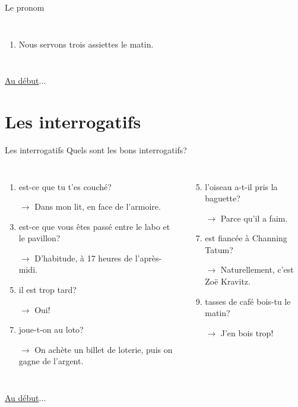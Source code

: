 \documentclass{beamer}
\begin{document}
\begin{frame}{Le pronom }
\begin{columns}[t]
\begin{enumerate}
            \item Nous \underline{  } servons \underline{\hspace{0.35cm}} trois \underline{\hspace{0.35cm}} assiettes \underline{\hspace{0.35cm}} le matin.
          \end{enumerate}
      \end{columns}
      \vspace{0.5cm}
      \hyperlink{début}{Au début}...
    \end{frame}

  \section{Les interrogatifs}
    \begin{frame}{Les interrogatifs}
      Quels sont les bons interrogatifs?
      \begin{columns}[t]
        \scriptsize
          \begin{enumerate}
            \item \underline{} est-ce que tu t'es couché?
            \item[$\to$] Dans mon lit, en face de l'armoire.
            \item \underline{} est-ce que vous êtes passé entre le labo et le pavillon?
            \item[$\to$] D'habitude, à 17 heures de l'après-midi.
            \item \underline{}il est trop tard?
            \item[$\to$] Oui!
            \item \underline{} joue-t-on au loto?
            \item[$\to$] On achète un billet de loterie, puis on gagne de l'argent.
          \end{enumerate}
          \begin{enumerate}
            \setcounter{enumi}{4}
            \item \underline{} l'oiseau a-t-il pris la baguette?
            \item[$\to$] Parce qu'il a faim.
            \item \underline{} est fiancée à Channing Tatum?
            \item[$\to$] Naturellement, c'est Zoë Kravitz.
            \item \underline{} tasses de café bois-tu le matin?
            \item[$\to$] J'en bois trop!
          \end{enumerate}
      \end{columns}
      \vspace{0.5cm}
      \hyperlink{début}{Au début}...
    \end{frame}
\end{document}
